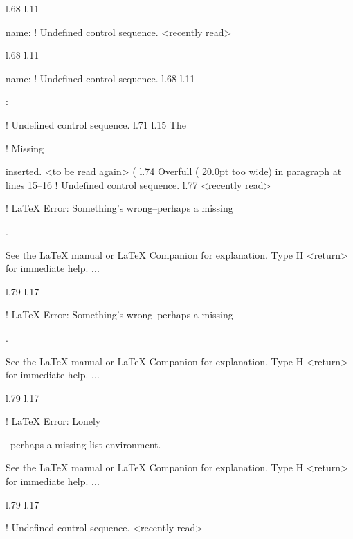 {{{{{{{{{{l.68 l.11       \item \xmlAttr
                              {name}: \xmlDesc
! Undefined control sequence.
<recently read> \xmlAttr 
                         
l.68 l.11       \item \xmlAttr
                              {name}: \xmlDesc
! Undefined control sequence.
l.68 l.11       \item {}: \xmlDesc
                                              
! Undefined control sequence.
l.71 l.15   The \xmlNode
                        
! Missing { inserted.
<to be read again> 
                   (
l.74 Overfull \hbox (
                     20.0pt too wide) in paragraph at lines 15--16
! Undefined control sequence.
l.77 <recently read> \xmlNode
                             

! LaTeX Error: Something's wrong--perhaps a missing \item.

See the LaTeX manual or LaTeX Companion for explanation.
Type  H <return>  for immediate help.
 ...                                              
                                                  
l.79 l.17     \item \xmlNode
                            

! LaTeX Error: Something's wrong--perhaps a missing \item.

See the LaTeX manual or LaTeX Companion for explanation.
Type  H <return>  for immediate help.
 ...                                              
                                                  
l.79 l.17     \item \xmlNode
                            

! LaTeX Error: Lonely \item--perhaps a missing list environment.

See the LaTeX manual or LaTeX Companion for explanation.
Type  H <return>  for immediate help.
 ...                                              
                                                  
l.79 l.17     \item \xmlNode
                            
! Undefined control sequence.
<recently read> \xmlNode 
                         
}}}}}}}}}}}
